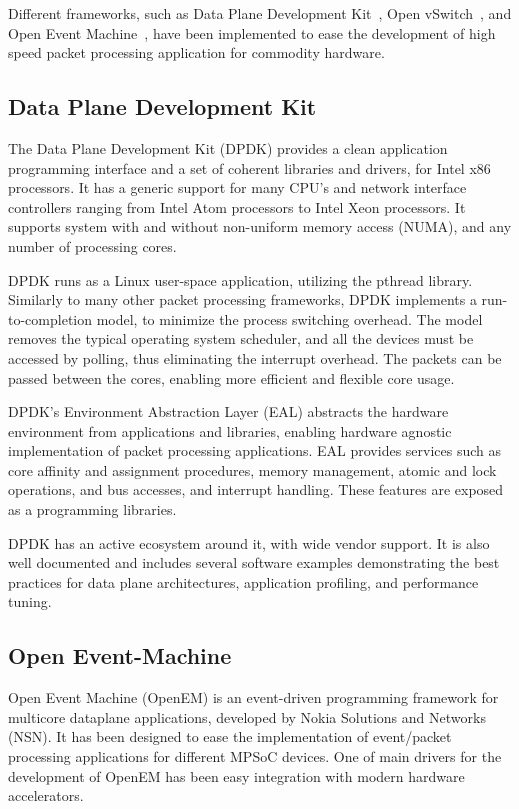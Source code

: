 Different frameworks, such as Data Plane Development Kit~\cite{Intel:DPDK}, Open vSwitch~\cite{Pfaff:2009:OVS}, and Open Event Machine~\cite{OpenEM}, have been implemented to ease the development of high speed packet processing application for commodity hardware.

\subsection{Data Plane Development Kit}
The Data Plane Development Kit (DPDK) provides a clean application programming interface and a set of coherent libraries and drivers, for Intel x86 processors. It has a generic support for many CPU's and network interface controllers ranging from Intel Atom processors to Intel Xeon processors. It supports system with and without non-uniform memory access (NUMA), and any number of processing cores.~\cite{Intel:DPDK:Doc}

DPDK runs as a Linux user-space application, utilizing the pthread library. Similarly to many other packet processing frameworks, DPDK implements a run-to-completion model, to minimize the process switching overhead. The model removes the typical operating system scheduler, and all the devices must be accessed by polling, thus eliminating the interrupt overhead. The packets can be passed between the cores, enabling more efficient and flexible core usage.~\cite{Intel:DPDK:Doc}

DPDK's Environment Abstraction Layer (EAL) abstracts the hardware environment from applications and libraries, enabling hardware agnostic implementation of packet processing applications. EAL provides services such as core affinity and assignment procedures, memory management, atomic and lock operations, and bus accesses, and interrupt handling. These features are exposed as a programming libraries.~\cite{Intel:DPDK:Doc}

DPDK has an active ecosystem around it, with wide vendor support. It is also well documented and includes several software examples demonstrating the best practices for data plane architectures, application profiling, and performance tuning.~\cite{Intel:DPDK:Doc}

\subsection{Open Event-Machine}
Open Event Machine (OpenEM) is an event-driven programming framework for multicore dataplane applications, developed by Nokia Solutions and Networks (NSN). It has been designed to ease the implementation of event/packet processing applications for different MPSoC devices. One of main drivers for the development of OpenEM has been easy integration with modern hardware accelerators.

